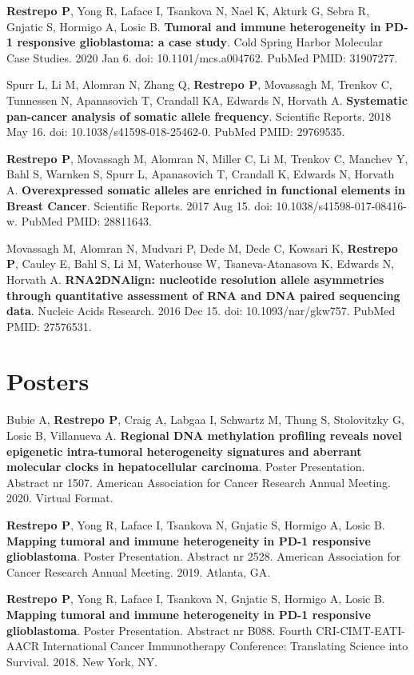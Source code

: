 \begin{minipage}[t]{0.675\textwidth}
\begin{tightitemize}
\item \textbf{Restrepo P}, Yong R, Laface I, Tsankova N, Nael K, Akturk G, Sebra R, Gnjatic S, Hormigo A, Losic B. \textbf{Tumoral and immune heterogeneity in PD-1 responsive glioblastoma: a case study}. Cold Spring Harbor Molecular Case Studies. 2020 Jan 6. doi: 10.1101/mcs.a004762. PubMed PMID: 31907277.

\item Spurr L, Li M, Alomran N, Zhang Q, \textbf{Restrepo P}, Movassagh M, Trenkov C, Tunnessen N, Apanasovich T, Crandall KA, Edwards N, Horvath A. \textbf{Systematic pan-cancer analysis of somatic allele frequency}. Scientific Reports. 2018 May 16. doi: 10.1038/s41598-018-25462-0. PubMed PMID: 29769535.

\item \textbf{Restrepo P}, Movassagh M, Alomran N, Miller C, Li M, Trenkov C, Manchev Y, Bahl S, Warnken S, Spurr L, Apanasovich T, Crandall K, Edwards N, Horvath A. \textbf{Overexpressed somatic alleles are enriched in functional elements in Breast Cancer}. Scientific Reports. 2017 Aug 15. doi: 10.1038/s41598-017-08416-w. PubMed PMID: 28811643.

\item Movassagh M, Alomran N, Mudvari P, Dede M, Dede C, Kowsari K, \textbf{Restrepo P}, Cauley E, Bahl S, Li M, Waterhouse W, Tsaneva-Atanasova K, Edwards N, Horvath A. \textbf{RNA2DNAlign: nucleotide resolution allele asymmetries through quantitative assessment of RNA and DNA paired sequencing data}. Nucleic Acids Research. 2016 Dec 15. doi: 10.1093/nar/gkw757. PubMed PMID: 27576531.
\end{tightitemize}

\section{Posters}
\vspace{\topsep} %
\begin{tightitemize}
\item Bubie A, \textbf{Restrepo P}, Craig A, Labgaa I, Schwartz M, Thung S, Stolovitzky G, Losic B, Villanueva A. \textbf{Regional DNA methylation profiling reveals novel epigenetic intra-tumoral heterogeneity signatures and aberrant molecular clocks in hepatocellular carcinoma}. Poster Presentation. Abstract nr 1507. American Association for Cancer Research Annual Meeting. 2020. Virtual Format.
\item \textbf{Restrepo P}, Yong R, Laface I, Tsankova N, Gnjatic S, Hormigo A, Losic B. \textbf{Mapping tumoral and immune heterogeneity in PD-1 responsive glioblastoma}. Poster Presentation. Abstract nr 2528. American Association for Cancer Research Annual Meeting. 2019. Atlanta, GA.
\item \textbf{Restrepo P}, Yong R, Laface I, Tsankova N, Gnjatic S, Hormigo A, Losic B. \textbf{Mapping tumoral and immune heterogeneity in PD-1 responsive glioblastoma}. Poster Presentation. Abstract nr B088. Fourth CRI-CIMT-EATI-AACR International Cancer Immunotherapy Conference: Translating Science into Survival. 2018. New York, NY.
\end{tightitemize}



\end{minipage}
